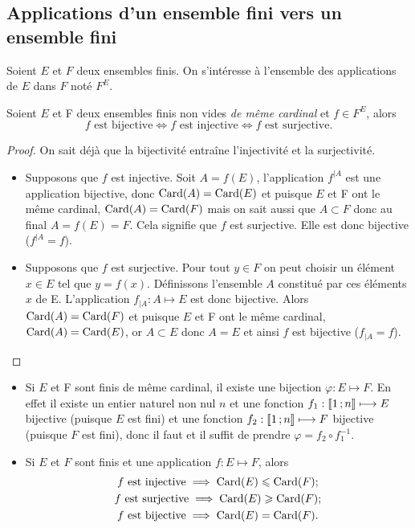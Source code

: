 \subsection{Applications d'un ensemble fini vers un ensemble fini}
Soient $E$ et $F$ deux ensembles finis. On s'intéresse à l'ensemble des applications de $E$ dans $F$ noté $F^E$.
\begin{theo}\label{theo:bijinjsurj}
  Soient $E$ et F deux ensembles finis non vides \emph{de même cardinal} et $f\in F^E$, alors
  \begin{equation}
    f \text{~est bijective}\iff f \text{~est injective}\iff f \text{~est surjective}.
  \end{equation}
\end{theo}
\begin{proof}
  On sait déjà que la bijectivité entraîne l'injectivité et la surjectivité.
  \begin{itemize}
  \item Supposons que $f$ est injective. Soit $A=f(E)$, l'application $f^{|A}$ est une application bijective, donc $\operatorname{Card}(A)=\operatorname{Card}(E)$ et puisque $E$ et F ont le même cardinal, $\operatorname{Card}(A)=\operatorname{Card}(F)$ mais on sait aussi que $A\subset F$ donc au final $A=f(E)=F$. Cela signifie que $f$ est surjective. Elle est donc bijective ($f^{|A}=f$).
  \item Supposons que $f$ est surjective. Pour tout $y\in F$ on peut choisir un élément $x\in E$ tel que $y=f(x)$. Définissons l'ensemble $A$ constitué par ces éléments $x$ de E. L'application $f_{|A}:A\longmapsto E$ est donc bijective. Alors $\operatorname{Card}(A)=\operatorname{Card}(F)$ et puisque $E$ et F ont le même cardinal, $\operatorname{Card}(A)=\operatorname{Card}(E)$, or $A\subset E$ donc $A=E$ et ainsi $f$ est bijective ($f_{|A}=f$).
  \end{itemize}
\end{proof}
\begin{itemize}
\item Si $E$ et F sont finis de même cardinal, il existe une bijection $\varphi:E\longmapsto F$. En effet il existe un entier naturel non nul $n$ et une fonction $f_1:\mathopen{\llbracket}1\mathclose{}\mathpunct{};n\mathclose{\rrbracket} \longmapsto E$ bijective (puisque $E$ est fini) et une fonction $f_2:\mathopen{\llbracket}1\mathclose{}\mathpunct{};n\mathclose{\rrbracket} \longmapsto F$ bijective (puisque $F$ est fini), donc il faut et il suffit de prendre $\varphi=f_2\circ f_1^{-1}$.
\item Si $E$ et $F$ sont finis et une application $f:E\longmapsto F$, alors
  \begin{gather}
    f \text{~est injective} \implies \operatorname{Card}(E)\leqslant\operatorname{Card}(F); \\
    f \text{~est surjective}\implies \operatorname{Card}(E)\geqslant\operatorname{Card}(F);\\
    f \text{~est bijective} \implies \operatorname{Card}(E)=\operatorname{Card}(F). 
  \end{gather}
\end{itemize}
